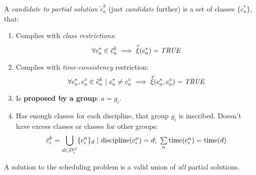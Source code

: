 \documentclass[ThesisDoc]{subfiles}
\begin{document}
\noindent
A \emph{candidate to partial solution} $\tilde{c}_a^k$ (just \emph{candidate} further)
is a set of classes $\{c_a^*\}$, that:
\begin{enumerate}
  \item Complies with \emph{class restrictions}: \\
    $$\forall c_a^* \in \tilde{c}_a^k \implies \accentset{C}{\xi}(c_a^*) = \mathit{TRUE}$$
  \item Complies with \emph{time-consistency} restriction: \\
    $$\forall c_a^*, c_a^\circ \in \tilde{c}_a^k ~|~ c_a^* \not= c_a^\circ \implies
      \accentset{T}{\xi}(c_a^*, c_a^\circ) = \mathit{TRUE}$$
  \item Is \textbf{proposed by a group}: $a = g_i$.
  \item Has enough classes for each discipline, that group $g_i$ is inscribed.
        Doesn't have excess classes or classes for other groups:
        $$\tilde{c}_i^k = \bigcup\limits_{d \in D^G_i}
                            \lbrace c_i^n \rbrace_d ~|~ \mathsmaller{
                                \mathrm{discipline}(c_i^n) = d;~
                                \sum\limits_n \mathrm{time}(c_i^n) =
                                              \mathrm{time}(d)   }$$

\end{enumerate}
\bigskip

\noindent
A solution to the scheduling problem is a valid union of \emph{all} partial solutions.
\end{document}

